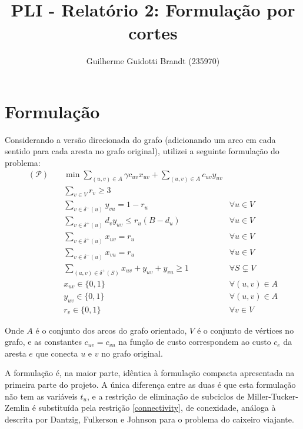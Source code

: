 \documentclass{article}
\title{PLI - Relatório 2: Formulação por cortes}
\author{Guilherme Guidotti Brandt (235970)}
\date{}
\begin{document}
\maketitle

\section{Formulação}

Considerando a versão direcionada do grafo (adicionando um arco em cada sentido para cada aresta no grafo original), utilizei a seguinte formulação do problema:
\begin{align}
    (\mathcal{P})\quad
    &\min \sum_{(u, v) \in A} \gamma c_{uv} x_{uv} + \sum_{(u, v) \in A} c_{uv} y_{uv}\nonumber\\
    &\sum_{v \in V} r_{v} \geq 3
        \label{min-partitions}\\
    &\sum_{v \in \delta^-(u)} y_{vu} = 1 - r_u
        &\forall u \in V\label{star-in-degree}\\
    &\sum_{v \in \delta^+(u)} d_v y_{uv} \leq r_u (B - d_u)
        &\forall u \in V\label{partition-packing}\\
    &\sum_{v \in \delta^+(u)} x_{uv} = r_u
        &\forall u \in V\label{circuit-out-degree}\\
    &\sum_{v \in \delta^-(u)} x_{vu} = r_u
        &\forall u \in V\label{circuit-in-degree}\\
    &\sum_{(u, v) \in \delta^+(S)} x_{uv} + y_{uv} + y_{vu} \geq 1
        &\forall S \subsetneq V\label{connectivity}\\
    &x_{uv} \in \{0, 1\}&\forall (u, v) \in A\nonumber\\
    &y_{uv} \in \{0, 1\}&\forall (u, v) \in A\nonumber\\
    &r_{v} \in \{0, 1\}&\forall v \in V\nonumber
\end{align}

Onde $A$ é o conjunto dos arcos do grafo orientado, $V$ é o conjunto de vértices no grafo, e as constantes $c_{uv} = c_{vu}$ na função de custo correspondem ao custo $c_e$ da aresta $e$ que conecta $u$ e $v$ no grafo original.

A formulação é, na maior parte, idêntica à formulação compacta apresentada na primeira parte do projeto. A única diferença entre as duas é que esta formulação não tem as variáveis $t_u$, e a restrição de eliminação de subciclos de Miller-Tucker-Zemlin é substituída pela restrição \ref{connectivity}, de conexidade, análoga à descrita por Dantzig, Fulkerson e Johnson para o problema do caixeiro viajante.
\end{document}
